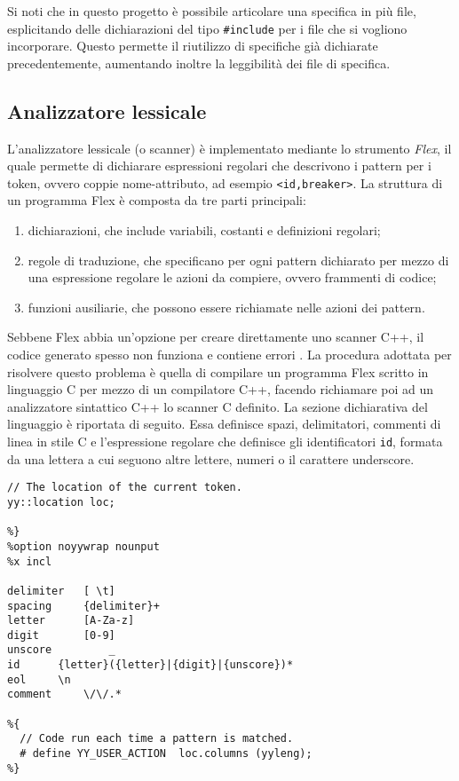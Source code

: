 Si noti che in questo progetto è possibile articolare una specifica in più file, esplicitando delle dichiarazioni del tipo \verb|#include| per i file che si vogliono incorporare. 
Questo permette il riutilizzo di specifiche già dichiarate precedentemente, aumentando inoltre la leggibilità dei file di specifica.


\subsection{Analizzatore lessicale}
L'analizzatore lessicale (o scanner) è implementato mediante lo strumento \emph{Flex}, il quale permette di dichiarare espressioni regolari che descrivono i pattern per i token, ovvero coppie nome-attributo, ad esempio \verb|<id,breaker>|. La struttura di un programma Flex  è composta da tre parti principali:
\begin{enumerate}
\item dichiarazioni, che include variabili, costanti e definizioni regolari;
\item regole di traduzione, che specificano per ogni pattern dichiarato per mezzo di una espressione regolare le azioni da compiere, ovvero frammenti di codice;
\item funzioni ausiliarie, che possono essere richiamate nelle azioni dei pattern.
\end{enumerate}
Sebbene Flex abbia un'opzione per creare direttamente uno scanner C++, il codice generato spesso non funziona e contiene errori\cite{book:bison} .
La procedura adottata per risolvere questo problema è quella di compilare un programma Flex scritto in linguaggio C per mezzo di un compilatore C++, facendo richiamare poi ad un analizzatore sintattico C++ lo scanner C definito.
La sezione dichiarativa del linguaggio è riportata di seguito. Essa definisce spazi, delimitatori, commenti di linea in stile C e l'espressione regolare che definisce gli identificatori \verb|id|, formata da una lettera a cui seguono altre lettere, numeri o  il carattere underscore.

\begin{verbatim}
// The location of the current token.
yy::location loc;

%}
%option noyywrap nounput
%x incl

delimiter	[ \t]
spacing		{delimiter}+
letter		[A-Za-z]
digit		[0-9]
unscore         _
id		{letter}({letter}|{digit}|{unscore})*
eol		\n
comment		\/\/.*

%{
  // Code run each time a pattern is matched.
  # define YY_USER_ACTION  loc.columns (yyleng);
%}
\end{verbatim}

